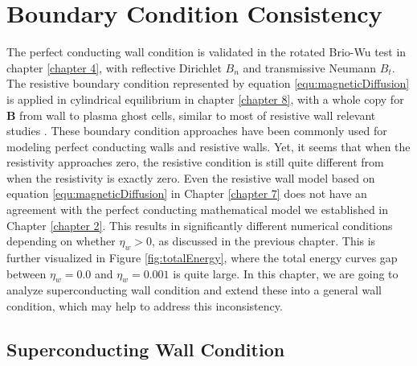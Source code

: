 
\chapter{Boundary Condition Consistency}  %

\ifpdf
    \graphicspath{{Chapter10/Figs/Raster/}{Chapter10/Figs/PDF/}{Chapter10/Figs/}}
\else
    \graphicspath{{Chapter10/Figs/Vector/}{Chapter10/Figs/}}
\fi

\label{chapter 10}



The perfect conducting wall condition is validated in the rotated Brio-Wu test in chapter \ref{chapter 4}, with reflective Dirichlet $B_n$ and transmissive Neumann $B_t$. The resistive boundary condition represented by equation \ref{equ:magneticDiffusion} is applied in cylindrical equilibrium in chapter \ref{chapter 8}, with a whole copy for $\mathbf{B}$ from wall to plasma ghost cells, similar to most of resistive wall relevant studies \cite{chrysanthou2020,ferraro2016multi,becerra2016resistive,hender1989effects}. These boundary condition approaches have been commonly used for modeling perfect conducting walls and resistive walls. Yet, it seems that when the resistivity approaches zero, the resistive condition is still quite different from when the resistivity is exactly zero. Even the resistive wall model based on equation \ref{equ:magneticDiffusion} in Chapter \ref{chapter 7} does not have an agreement with the perfect conducting mathematical model we established in Chapter \ref{chapter 2}. This results in significantly different numerical conditions depending on whether $\eta_{w}>0$, as discussed in the previous chapter. This is further visualized in Figure \ref{fig:totalEnergy}, where the total energy curves gap between $\eta_w=0.0$ and $\eta_w=0.001$ is quite large. In this chapter, we are going to analyze superconducting wall condition and extend these into a general wall condition, which may help to address this inconsistency.

\section{Superconducting Wall Condition}
